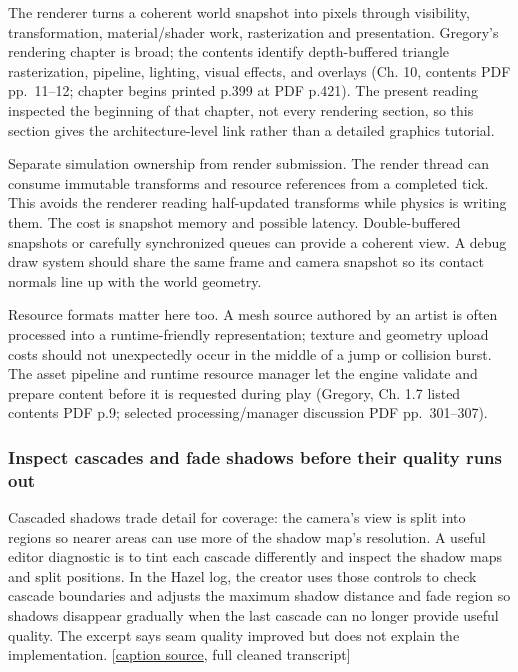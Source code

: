 The renderer turns a coherent world snapshot into pixels through visibility, transformation, material/shader work, rasterization and presentation. Gregory's rendering chapter is broad; the contents identify depth-buffered triangle rasterization, pipeline, lighting, visual effects, and overlays (Ch. 10, contents PDF pp.~11--12; chapter begins printed p.399 at PDF p.421). The present reading inspected the beginning of that chapter, not every rendering section, so this section gives the architecture-level link rather than a detailed graphics tutorial.

Separate simulation ownership from render submission. The render thread can consume immutable transforms and resource references from a completed tick. This avoids the renderer reading half-updated transforms while physics is writing them. The cost is snapshot memory and possible latency. Double-buffered snapshots or carefully synchronized queues can provide a coherent view. A debug draw system should share the same frame and camera snapshot so its contact normals line up with the world geometry.

Resource formats matter here too. A mesh source authored by an artist is often processed into a runtime-friendly representation; texture and geometry upload costs should not unexpectedly occur in the middle of a jump or collision burst. The asset pipeline and runtime resource manager let the engine validate and prepare content before it is requested during play (Gregory, Ch. 1.7 listed contents PDF p.9; selected processing/manager discussion PDF pp.~301--307).

\subsubsection{Inspect cascades and fade shadows before their quality runs out}\label{06-engine-ii-ch026-inspect-cascades-and-fade-shadows-before-their-quality-runs-out}

Cascaded shadows trade detail for coverage: the camera's view is split into regions so nearer areas can use more of the shadow map's resolution. A useful editor diagnostic is to tint each cascade differently and inspect the shadow maps and split positions. In the Hazel log, the creator uses those controls to check cascade boundaries and adjusts the maximum shadow distance and fade region so shadows disappear gradually when the last cascade can no longer provide useful quality. The excerpt says seam quality improved but does not explain the implementation. {[}\href{https://www.youtube.com/watch?v=qbDrqARX07o}{caption source}, full cleaned transcript{]}

